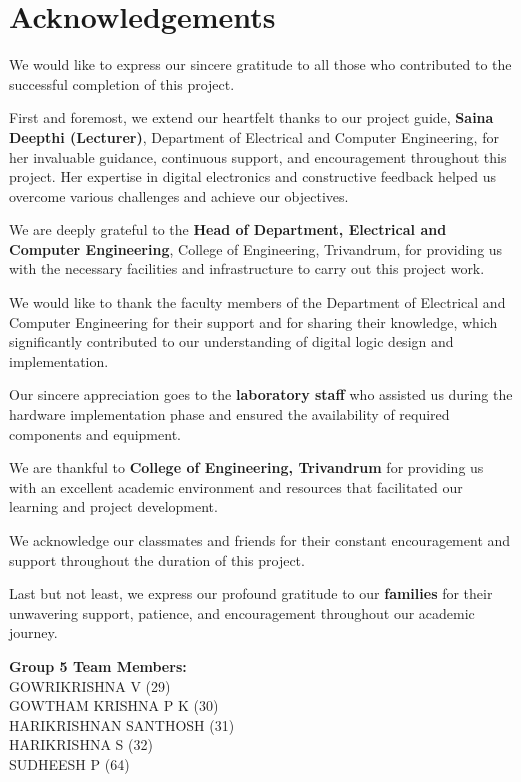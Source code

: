 \chapter{Acknowledgements}

We would like to express our sincere gratitude to all those who contributed to the successful completion of this project.

First and foremost, we extend our heartfelt thanks to our project guide, \textbf{Saina Deepthi (Lecturer)}, Department of Electrical and Computer Engineering, for her invaluable guidance, continuous support, and encouragement throughout this project. Her expertise in digital electronics and constructive feedback helped us overcome various challenges and achieve our objectives.

We are deeply grateful to the \textbf{Head of Department, Electrical and Computer Engineering}, College of Engineering, Trivandrum, for providing us with the necessary facilities and infrastructure to carry out this project work.

We would like to thank the faculty members of the Department of Electrical and Computer Engineering for their support and for sharing their knowledge, which significantly contributed to our understanding of digital logic design and implementation.

Our sincere appreciation goes to the \textbf{laboratory staff} who assisted us during the hardware implementation phase and ensured the availability of required components and equipment.

We are thankful to \textbf{College of Engineering, Trivandrum} for providing us with an excellent academic environment and resources that facilitated our learning and project development.

We acknowledge our classmates and friends for their constant encouragement and support throughout the duration of this project.

Last but not least, we express our profound gratitude to our \textbf{families} for their unwavering support, patience, and encouragement throughout our academic journey.

\vspace{2em}

\begin{flushright}
\textbf{Group 5 Team Members:} \\
GOWRIKRISHNA V (29) \\
GOWTHAM KRISHNA P K (30) \\
HARIKRISHNAN SANTHOSH (31) \\
HARIKRISHNA S (32) \\
SUDHEESH P (64)
\end{flushright}